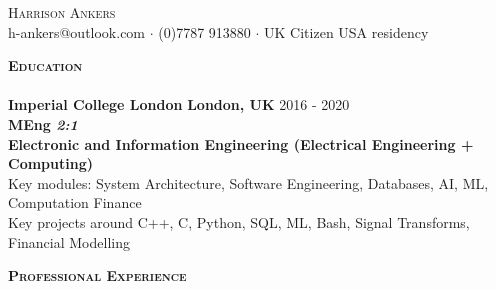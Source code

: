 \documentclass[a4paper]{article}
\newcommand{\lineunder} {
    \vspace*{-8pt} \\
    \hspace*{-28pt} \hrulefill \\
}
\newcommand{\header} [1] {
    {\hspace*{-28pt}\vspace*{6pt} \textsc{#1}}
    \vspace*{-2pt} \lineunder
}
\begin{document}
\vspace*{-20pt}



\vspace*{-20pt}
\begin{center}
    {\Huge \scshape {Harrison Ankers}}\\
    h-ankers@outlook.com \textbf{$\cdot$} (0)7787 913880 \textbf{$\cdot$} UK Citizen USA residency
\end{center}

\normalsize
\header{\textbf{Education}}
\textbf{Imperial College London  }\hfill \textbf{London, UK} 2016 - 2020 \\
\qquad \textbf{MEng \hfill  \textit{2:1}}  \\
\qquad \textbf{Electronic and Information Engineering (Electrical Engineering + Computing)}  \\
\quad Key modules: System Architecture, Software Engineering, Databases, AI, ML, Computation Finance \\
\quad Key projects around C++, C, Python, SQL, ML, Bash, Signal Transforms, Financial Modelling
\vspace{2mm}

\header{\textbf{Professional Experience}}
\vspace{1mm}
\end{document}
